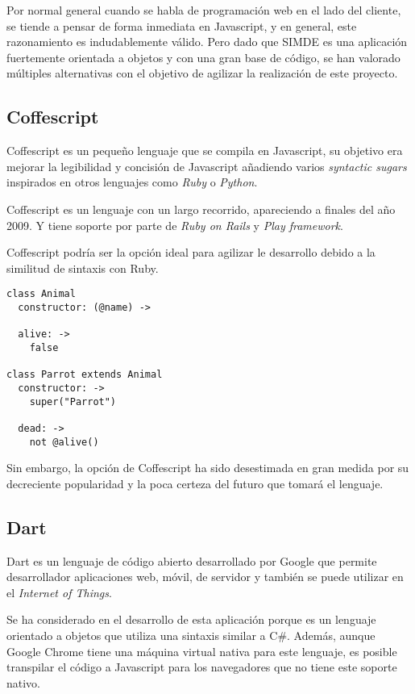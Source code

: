 Por normal general cuando se habla de programación web en el lado del cliente, se tiende a pensar
de forma inmediata en Javascript, y en general, este razonamiento es indudablemente válido. 
Pero dado que SIMDE es una aplicación fuertemente orientada a objetos y con una gran base de código, 
se han valorado múltiples alternativas con el objetivo de agilizar la realización de este proyecto.

\subsection{Coffescript}

Coffescript es un pequeño lenguaje que se compila en Javascript, su objetivo era mejorar la legibilidad 
y concisión de Javascript añadiendo varios \textit{syntactic sugars} inspirados en otros lenguajes como
\textit{Ruby} o \textit{Python}.

\bigskip
Coffescript es un lenguaje con un largo recorrido, apareciendo a finales del año 2009. Y tiene soporte por
parte de \textit{Ruby on Rails} y \textit{Play framework}.

\bigskip 
Coffescript podría ser la opción ideal para agilizar le desarrollo debido a la similitud de sintaxis con 
Ruby.

\begin{lstlisting}
class Animal
  constructor: (@name) ->

  alive: ->
    false

class Parrot extends Animal
  constructor: ->
    super("Parrot")

  dead: ->
    not @alive()
\end{lstlisting}

\bigskip
Sin embargo, la opción de Coffescript ha sido desestimada en gran medida por su decreciente popularidad
y la poca certeza del futuro que tomará el lenguaje.

\subsection{Dart}

Dart es un lenguaje de código abierto desarrollado por Google que permite desarrollador aplicaciones web, móvil, 
de servidor y también se puede utilizar en el \textit{Internet of Things}. 

\bigskip
Se ha considerado en el desarrollo de esta aplicación porque es un lenguaje orientado a objetos que utiliza una 
sintaxis similar a C\#. Además, aunque Google Chrome tiene una máquina virtual nativa para este lenguaje, es posible
transpilar el código a Javascript para los navegadores que no tiene este soporte nativo.


